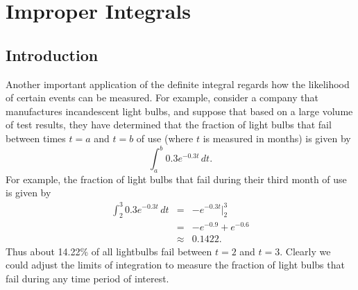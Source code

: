 \section{Improper Integrals} \label{S:6.5.Improper}

\vspace*{-14 pt}

\subsection*{Introduction}

Another important application of the definite integral %
regards how the likelihood of certain events can be measured.  For example, consider a company that manufactures incandescent light bulbs, and suppose that based on a large volume of test results, they have determined that the fraction of light bulbs that fail between times $t = a$ and $t = b$ of use (where $t$ is measured in months) is given by 
$$\int_a^b 0.3 e^{-0.3t} \, dt.$$
For example, the fraction of light bulbs that fail during their third month of use is given by
\begin{eqnarray*} 
\int_2^3 0.3e^{-0.3t} \, dt & = & -e^{-0.3t} \bigg \vert_2^3 \\
				& = & -e^{-0.9} + e^{-0.6} \\
				& \approx & 0.1422.
\end{eqnarray*}
Thus about 14.22\% of all lightbulbs fail between $t = 2$ and $t = 3$.  %
Clearly we could adjust the limits of integration to measure the fraction of light bulbs that fail during any time period of interest.




